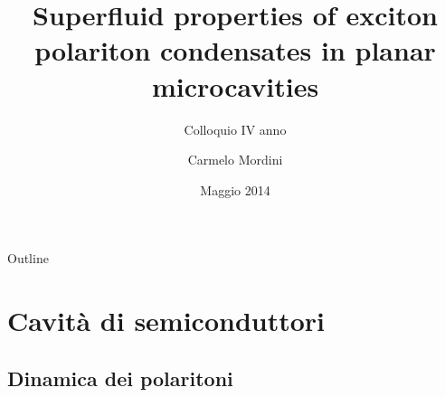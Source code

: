 \documentclass[10pt]{beamer}
\title{Superfluid properties of exciton polariton condensates in planar microcavities}
\subtitle{Colloquio IV anno}
\author[Carmelo Mordini]{Carmelo Mordini\\ \vspace{.7cm}{\tiny Supervisors\\ \vspace{-.2cm}I. Carusotto ~ R. Fazio}}
\institute[SNS] 
{
  Scuola Normale Superiore\\
  }
\date{Maggio 2014}
\begin{document}
\begin{frame}
  \titlepage
\end{frame}

\begin{frame}{Outline}
  \tableofcontents[pausesections]
\end{frame}

\section{Cavità di semiconduttori}

\subsection{Dinamica dei polaritoni}
\end{document}

